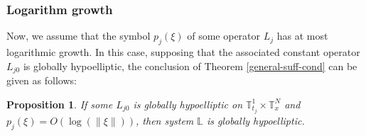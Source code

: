 \documentclass[12pt]{elsarticle}
\newtheorem{proposition}[theorem]{Proposition}
\numberwithin{equation}{section}
\begin{document}
\subsubsection{Logarithm growth \label{sec-Log-cond}}
Now, we assume that the symbol $p_j(\xi)$ of some operator $L_j$ has at most logarithmic growth. In this case, supposing that the associated constant operator $L_{j0}$ is globally hypoelliptic, the conclusion of Theorem \ref{general-suff-cond} can be given as follows:


\begin{proposition}\label{prop_log}
	If some $L_{j0}$ is globally hypoelliptic on $\mathbb{T}_{t_j}^1\times\mathbb{T}_x^N$ and $p_j(\xi)=O(\log(\|\xi\|))$, then  system  $\mathbb{L}$ is globally hypoelliptic.
\end{proposition}
\end{document}
